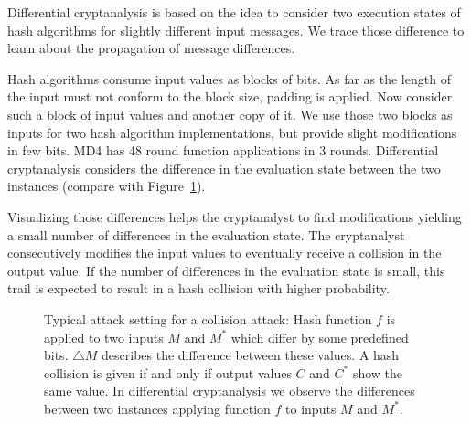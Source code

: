 Differential cryptanalysis is based on the idea to consider two execution states
of hash algorithms for slightly different input messages. We trace those difference
to learn about the propagation of message differences.


Hash algorithms consume input values as blocks of bits.
As far as the length of the input must not conform to the block size,
padding is applied. Now consider such a block of input values
and another copy of it. We use those two blocks as inputs for two
hash algorithm implementations, but provide slight modifications in few bits.
MD4 has 48 round function applications in 3 rounds.
Differential cryptanalysis considers the difference in the evaluation
state between the two instances (compare with Figure~\ref{tab:collision-attack}).

Visualizing those differences helps the cryptanalyst to find modifications yielding
a small number of differences in the evaluation state.
The cryptanalyst consecutively modifies the input values to eventually
receive a collision in the output value.
If the number of differences in the evaluation state is small,
this trail is expected to result in a hash collision with higher probability.

\begin{figure}[pbt]
  \begin{center}
    \caption[Typical attack setting for a collision attack]{
      Typical attack setting for a collision attack:
      Hash function $f$ is applied to two inputs $M$ and $M^*$ which differ
      by some predefined bits. $\triangle M$ describes the difference between
      these values. A hash collision is given if and only if output values
      $C$ and $C^*$ show the same value. In differential cryptanalysis we observe
      the differences between two instances applying function $f$
      to inputs $M$ and $M^*$.
    }
    \label{tab:collision-attack}
  \end{center}
\end{figure}

